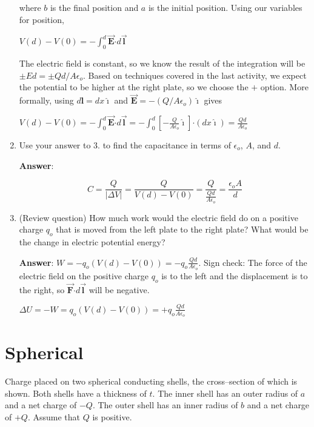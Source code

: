\documentclass{article}
\newcommand{\ds}[0]{\displaystyle}
\newcommand{\ihat}[0]{\hat{\boldsymbol{\imath}}}
\newcommand{\bfvec}[1]{\vec{\mathbf{#1}}}
\newcommand{\bfcdot}[0]{\boldsymbol{\cdot}}
\begin{document}
\begin{enumerate}
        where $b$ is the final position and $a$ is the initial position. Using our variables for position,

        $\ds V(d)-V(0) = -\int_0^d\bfvec{E}\bfcdot d\bfvec{l}$

        The electric field is constant, so we know the result of the integration will be $\pm Ed=\pm Qd/A\epsilon_o$. Based on techniques covered in the last activity, we expect the potential to be higher at the right plate, so we choose the $+$ option. More formally, using $d\mathbf{l}=dx\ihat$  and $\bfvec{E}=-({Q}/{A\epsilon_o})\ihat$ gives

        $\ds V(d)-V(0) = -\int_0^d\bfvec{E}\bfcdot d\bfvec{l}=-\int_0^d\left[-\frac{Q}{A\epsilon_o}\ihat\right]\bfcdot (dx\ihat)=\frac{Qd}{A\epsilon_o}$
        \else
        \vskip 36pt
        \fi

  \item Use your answer to 3. to find the capacitance in terms of $\epsilon_o$, $A$, and $d$.

        \ifsolutions
        {\bf Answer}:

        $$C = \frac{Q}{|\Delta V|} = \frac{Q}{V(d)-V(0)} = \frac{Q}{\frac{Qd}{A\epsilon_o}}=\frac{\epsilon_oA}{d}$$
        \else
        \vskip 36pt
        \fi

  \item (Review question) How much work would the electric field do on a positive charge $q_o$ that is moved from the left plate to the right plate? What would be the change in electric potential energy?

        \ifsolutions
        {\bf Answer}: $\ds W=-q_o(V(d)-V(0))=-q_o\frac{Qd}{A\epsilon_o}$. Sign check: The force of the electric field on the positive charge $q_o$ is to the left and the displacement is to the right, so $\bfvec{F}\bfcdot d\bfvec{l}$ will be negative.

        $\ds\Delta U=-W=q_o(V(d)-V(0))=+q_o\frac{Qd}{A\epsilon_o}$
        \else
        \vskip 36pt
        \fi

\end{enumerate}

\section{Spherical}

Charge placed on two spherical conducting shells, the cross--section of which is shown. Both shells have a thickness of $t$. The inner shell has an outer radius of $a$ and a net charge of $-Q$. The outer shell has an inner radius of $b$ and a net charge of $+Q$. Assume that $Q$ is positive.
\end{document}
